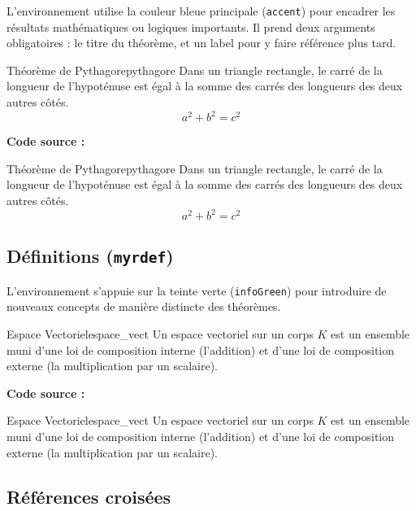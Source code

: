 L'environnement  utilise la couleur bleue principale (\texttt{accent}) pour encadrer les résultats mathématiques ou logiques importants. Il prend deux arguments obligatoires : le titre du théorème, et un label pour y faire référence plus tard.

\begin{myrthm}{Théorème de Pythagore}{pythagore}
  Dans un triangle rectangle, le carré de la longueur de l'hypoténuse est égal à la somme des carrés des longueurs des deux autres côtés.
  \[ a^2 + b^2 = c^2 \]
\end{myrthm}

\textbf{Code source :}
\begin{texblock}
\begin{myrthm}{Théorème de Pythagore}{pythagore}
  Dans un triangle rectangle, le carré de la longueur de l'hypoténuse est égal à la somme des carrés des longueurs des deux autres côtés.
  \[ a^2 + b^2 = c^2 \]
\end{myrthm}
\end{texblock}

\subsection{Définitions (\texttt{myrdef})}

L'environnement  s'appuie sur la teinte verte (\texttt{infoGreen}) pour introduire de nouveaux concepts de manière distincte des théorèmes.

\begin{myrdef}{Espace Vectoriel}{espace_vect}
  Un espace vectoriel sur un corps $K$ est un ensemble muni d'une loi de composition interne (l'addition) et d'une loi de composition externe (la multiplication par un scalaire).
\end{myrdef}

\textbf{Code source :}
\begin{texblock}
\begin{myrdef}{Espace Vectoriel}{espace_vect}
  Un espace vectoriel sur un corps $K$ est un ensemble muni d'une loi de composition interne (l'addition) et d'une loi de composition externe (la multiplication par un scalaire).
\end{myrdef}
\end{texblock}

\subsection{Références croisées}

